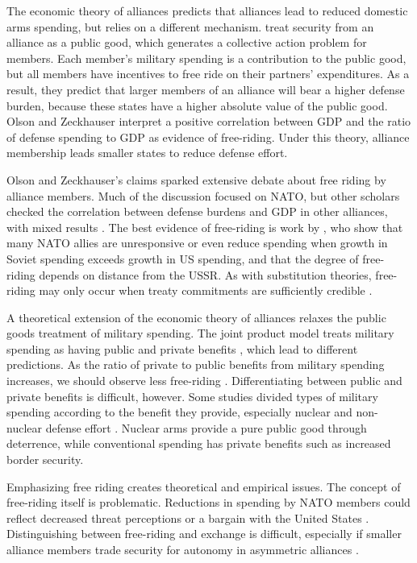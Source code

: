 \documentclass[12pt]{article}
\begin{document}
The economic theory of alliances predicts that alliances lead to reduced domestic arms spending, but relies on a different mechanism. \citet{OlsonZeckhauser1966} treat security from an alliance as a public good, which generates a collective action problem for members. Each member's military spending is a contribution to the public good, but all members have incentives to free ride on their partners' expenditures. As a result, they predict that larger members of an alliance will bear a higher defense burden, because these states have a higher absolute value of the public good. Olson and Zeckhauser interpret a positive correlation between GDP and the ratio of defense spending to GDP as evidence of free-riding. Under this theory, alliance membership leads smaller states to reduce defense effort. 

Olson and Zeckhauser's claims sparked extensive debate about free riding by alliance members. Much of the discussion focused on NATO, but other scholars checked the correlation between defense burdens and GDP in other alliances, with mixed results \citep{Reisinger1983, Thies1987, GatesTerasawa1992, Chenetal1996, OnealWhatley1996, Siroky2012}. The best evidence of free-riding is work by \citet{PluemperNeumayer2015}, who show that many NATO allies are unresponsive or even reduce spending when growth in Soviet spending exceeds growth in US spending, and that the degree of free-riding depends on distance from the USSR. As with substitution theories, free-riding may only occur when treaty commitments are sufficiently credible \citep{GatesTerasawa1992}. 

A theoretical extension of the economic theory of alliances relaxes the public goods treatment of military spending. The joint product model treats military spending as having public and private benefits \citep{ConybeareSandler1990}, which lead to different predictions. As the ratio of private to public benefits from military spending increases, we should observe less free-riding \citep{Murdoch1995, SandlerHartley2001}. Differentiating between public and private benefits is difficult, however. Some studies divided types of military spending according to the benefit they provide, especially nuclear and non-nuclear defense effort \citep{Hansenetal1990}. Nuclear arms provide a pure public good through deterrence, while conventional spending has private benefits such as increased border security. 

Emphasizing free riding creates theoretical and empirical issues. The concept of free-riding itself is problematic. Reductions in spending by NATO members could reflect decreased threat perceptions or a bargain with the United States \citep{Lanoszka2015}. Distinguishing between free-riding and exchange is difficult, especially if smaller alliance members trade security for autonomy in asymmetric alliances \citep{Morrow1991}. 
\end{document}
